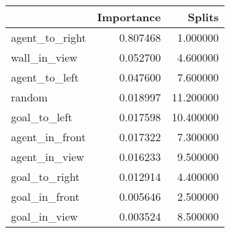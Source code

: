 \begin{tabular}{lrr}
\toprule
 & Importance & Splits \\
\midrule
agent\_to\_right & 0.807468 & 1.000000 \\
wall\_in\_view & 0.052700 & 4.600000 \\
agent\_to\_left & 0.047600 & 7.600000 \\
random & 0.018997 & 11.200000 \\
goal\_to\_left & 0.017598 & 10.400000 \\
agent\_in\_front & 0.017322 & 7.300000 \\
agent\_in\_view & 0.016233 & 9.500000 \\
goal\_to\_right & 0.012914 & 4.400000 \\
goal\_in\_front & 0.005646 & 2.500000 \\
goal\_in\_view & 0.003524 & 8.500000 \\
\bottomrule
\end{tabular}